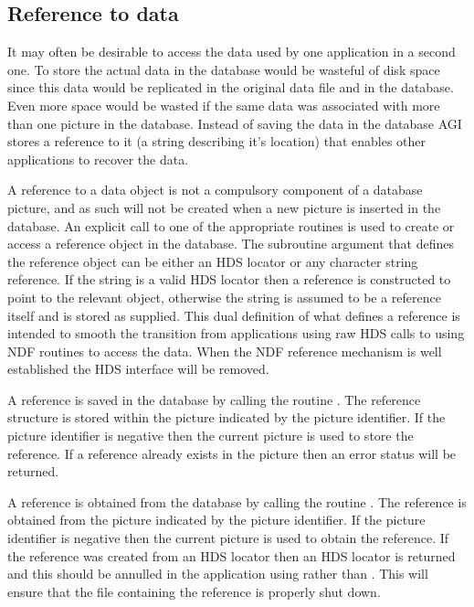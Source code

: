 \documentclass[twoside,11pt,nolof]{starlink}
\begin{document}
\subsection{Reference to data}
It may often be desirable to access the data used by one application
in a second one. To store the actual data in the database would be wasteful
of disk space since this data would be replicated in the original data file
and in the database. Even more space would be wasted if the same data
was associated with more than one picture in the database. Instead of
saving the data in the database AGI stores a reference to it (a string
describing it's location) that enables other applications to recover the
data.

A reference to a data object is not a compulsory component of a database
picture, and as such will not be created when a new picture is inserted
in the database.
An explicit call to one of the appropriate routines is used
to create or access a reference object in the database.
The subroutine argument that defines the reference object can be either
an HDS locator or any character string reference. If the string is a
valid HDS locator then a reference is constructed to point to the
relevant object, otherwise the string is assumed to be a reference
itself and is stored as supplied. This dual definition of what defines
a reference is intended to smooth the transition from applications
using raw HDS calls to using NDF routines to access the data. When the
NDF reference mechanism is well established the HDS interface will be
removed.

A reference is saved in the database by calling the routine
. The reference
structure is stored within the picture indicated by the picture
identifier. If the picture identifier is negative then the current
picture is used to store the reference. If a reference already exists
in the picture then an error status will be returned.

A reference is obtained from the database by calling the routine
.
The reference is obtained from the picture indicated
by the picture identifier. If the picture identifier is negative then
the current picture is used to obtain the reference.
If the reference was created from an HDS locator then an HDS locator
is returned and this should be annulled in the application using
rather than . This will ensure that
the file containing the reference is properly shut down.
\end{document}

